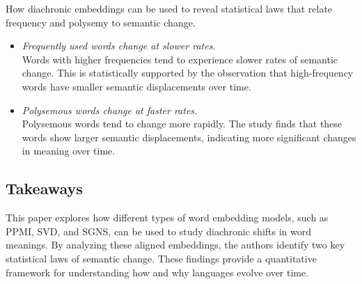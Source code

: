 How diachronic embeddings can be used to reveal statistical laws that relate frequency and polysemy to semantic change.

\begin{itemize}
    \item {} \emph{Frequently used words change at slower rates.}\\
    Words with higher frequencies tend to experience slower rates of semantic change.
    This is statistically supported by the observation that high-frequency words have smaller semantic displacements over time.
    \item {} \emph{Polysemous words change at faster rates.}\\
    Polysemous words tend to change more rapidly.
    The study finds that these words show larger semantic displacements, indicating more significant changes in meaning over time.
\end{itemize}

\subsection{Takeaways}
This paper explores how different types of word embedding models, such as PPMI, SVD, and SGNS, can be used to study diachronic shifts in word meanings.
By analyzing these aligned embeddings, the authors identify two key statistical laws of semantic change.
These findings provide a quantitative framework for understanding how and why languages evolve over time.


